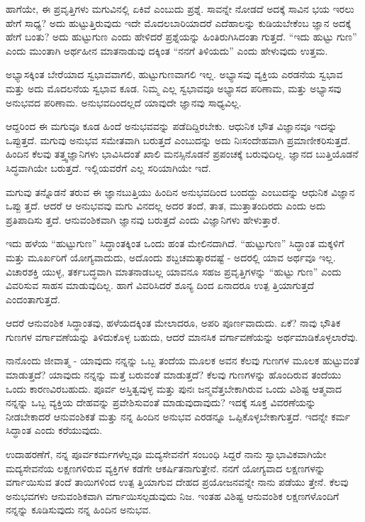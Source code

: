 ಹಾಗೆಯೇ, ಈ ಪ್ರವೃತ್ತಿಗಳು ಮಗುವಿನಲ್ಲಿ ಏಕಿವೆ ಎಂಬುದು ಪ್ರಶ್ನೆ. ಸಾವನ್ನೇ ನೋಡದೆ ಅದಕ್ಕೆ ಸಾವಿನ ಭಯ ಇರಲು ಹೇಗೆ ಸಾಧ್ಯ? ಅದು ಹುಟ್ಟುತ್ತಿರುವುದು ಇದೇ ಮೊದಲಬಾರಿಯಾದರೆ ಎದೆಹಾಲನ್ನು ಕುಡಿಯಬೇಕೆಂಬ ಜ್ಞಾನ ಅದಕ್ಕೆ ಹೇಗೆ ಬಂತು? ಅದು ಹುಟ್ಟುಗುಣ ಎಂದು ಹೇಳಿದರೆ ಪ್ರಶ್ನೆಯನ್ನು ಹಿಂತಿರುಗಿಸಿದಂತಾ ಗುತ್ತದೆ. “ಇದು ಹುಟ್ಟು ಗುಣ” ಎಂದು ಮುಂತಾಗಿ ಅರ್ಥಹೀನ ಮಾತನಾಡುವು ದಕ್ಕಿಂತ “ನನಗೆ ತಿಳಿಯದು” ಎಂದು ಹೇಳುವುದು ಉತ್ತಮ.

ಅಭ್ಯಾಸಕ್ಕಿಂತ  ಬೇರೆಯಾದ ಸ್ವಭಾವವಾಗಲಿ, ಹುಟ್ಟುಗುಣವಾಗಲಿ ಇಲ್ಲ. ಅಭ್ಯಾಸವು ವ್ಯಕ್ತಿಯ ಎರಡನೆಯ ಸ್ವಭಾವ ಮತ್ತು ಅದು ಮೊದಲನೆಯ ಸ್ವಭಾವ ಕೂಡ. ನಿಮ್ಮ ಎಲ್ಲ ಸ್ವಭಾವವೂ ಅಭ್ಯಾಸದ ಪರಿಣಾಮ, ಮತ್ತು ಅಭ್ಯಾಸವು ಅನುಭವದ ಪರಿಣಾಮ. ಅನುಭವದಿಂದಲ್ಲದೆ ಯಾವುದೇ ಜ್ಞಾನವು ಸಾಧ್ಯವಿಲ್ಲ.

ಆದ್ದರಿಂದ ಈ ಮಗುವೂ ಕೂಡ ಹಿಂದೆ ಅನುಭವವನ್ನು ಪಡೆದಿದ್ದಿರಬೇಕು. ಆಧುನಿಕ ಭೌತ ವಿಜ್ಞಾನವೂ ಇದನ್ನು ಒಪ್ಪುತ್ತದೆ. ಮಗುವು ಅನುಭವ ಸಮೇತವಾಗಿ ಬರುತ್ತದೆ ಎಂಬುದನ್ನು ಅದು ನಿಃಸಂದೇಹವಾಗಿ ಪ್ರಮಾಣೀಕರಿಸುತ್ತದೆ. ಹಿಂದಿನ ಕೆಲವು ತತ್ತ್ವಜ್ಞಾನಿಗಳು ಭಾವಿಸಿದಂತೆ ಖಾಲಿ ಮನಸ್ಸಿನೊಡನೆ ಪ್ರಪಂಚಕ್ಕೆ ಬರುವುದಿಲ್ಲ. ಜ್ಞಾನದ ಬುತ್ತಿಯೊಡನೆ ಸಿದ್ಧವಾಗಿಯೇ ಬರುತ್ತದೆ. ಇಲ್ಲಿಯವರೆಗೆ ಎಲ್ಲ ಸರಿಯಾಗಿಯೇ ಇದೆ.

ಮಗುವು ತನ್ನೊಡನೆ ತರುವ ಈ ಜ್ಞಾನಬುತ್ತಿಯು ಹಿಂದಿನ ಅನುಭವದಿಂದ ಬಂದದ್ದು ಎಂಬುದನ್ನು ಆಧುನಿಕ ವಿಜ್ಞಾನ ಒಪ್ಪು ತ್ತದೆ. ಆದರೆ ಆ ಅನುಭವವು ಮಗು ವಿನದಲ್ಲ ಅದರ ತಂದೆ, ತಾತ, ಮುತ್ತಾತಂದಿರದು ಎಂದು ಅದು ಪ್ರತಿಪಾದಿಸು ತ್ತದೆ. ಆನುವಂಶಿಕವಾಗಿ ಜ್ಞಾನವು ಬರುತ್ತದೆ ಎಂದು ವಿಜ್ಞಾನಿಗಳು ಹೇಳುತ್ತಾರೆ.

ಇದು ಹಳೆಯ “ಹುಟ್ಟುಗುಣ” ಸಿದ್ಧಾಂತಕ್ಕಿಂತ ಒಂದು ಹಂತ ಮೇಲಿನದಾಗಿದೆ. “ಹುಟ್ಟುಗುಣ” ಸಿದ್ಧಾಂತ ಮಕ್ಕಳಿಗೆ ಮತ್ತು ಮೂರ್ಖರಿಗೆ ಯೋಗ್ಯವಾದುದು, ಅದೊಂದು ಶಬ್ದಚಮತ್ಕಾರವಷ್ಟೆ - ಅದರಲ್ಲಿ ಯಾವ ಅರ್ಥವೂ ಇಲ್ಲ. ವಿಚಾರಶಕ್ತಿ ಯುಳ್ಳ, ತರ್ಕಬದ್ಧವಾಗಿ ಮಾತನಾಡಬಲ್ಲ ಯಾವನೂ ಸಹಜ ಪ್ರವೃತ್ತಿಗಳನ್ನು “ಹುಟ್ಟು ಗುಣ” ಎಂದು ವಿವರಿಸುವ ಸಾಹಸ ಮಾಡುವುದಿಲ್ಲ. ಹಾಗೆ ವಿವರಿಸಿದರೆ ಶೂನ್ಯ ದಿಂದ ಏನಾದರೂ ಉತ್ಪ ತ್ತಿಯಾಗುತ್ತದೆ ಎಂದಂತಾಗುತ್ತದೆ.

ಆದರೆ ಆನುವಂಶಿಕ ಸಿದ್ಧಾಂತವು, ಹಳೆಯದಕ್ಕಿಂತ ಮೇಲಾದರೂ, ಅಪರಿ ಪೂರ್ಣವಾದುದು. ಏಕೆ? ನಾವು ಭೌತಿಕ ಗುಣಗಳ ವರ್ಗಾವಣೆಯನ್ನು ತಿಳಿದುಕೊಳ್ಳ ಬಹುದು, ಆದರೆ ಮಾನಸಿಕ ವರ್ಗಾವಣೆಯನ್ನು ಅರ್ಥಮಾಡಿಕೊಳ್ಳಲಾರೆವು.

ನಾನೊಂದು ಜೀವಾತ್ಮ - ಯಾವುದು ನನ್ನನ್ನು ಒಬ್ಬ ತಂದೆಯ ಮೂಲಕ ಅವನ ಕೆಲವು ಗುಣಗಳ ಮೂಲಕ ಹುಟ್ಟುವಂತೆ ಮಾಡುತ್ತದೆ? ಯಾವುದು ನನ್ನನ್ನು ಮತ್ತೆ ಬರುವಂತೆ ಮಾಡುತ್ತದೆ? ಕೆಲವು ಗುಣಗಳನ್ನು ಹೊಂದಿರುವ ತಂದೆಯು ಒಂದು ಕಾರಣವಿರಬಹುದು. ಪೂರ್ವ ಅಸ್ತಿತ್ವವುಳ್ಳ ಮತ್ತು ಪುನಃ ಜನ್ಮವೆತ್ತಬೇಕಾಗಿರುವ ಒಂದು ವಿಶಿಷ್ಟ ಆತ್ಮವಾದ ನನ್ನನ್ನು ಒಬ್ಬ ವ್ಯಕ್ತಿಯ ದೇಹವನ್ನು ಪ್ರವೇಶಿಸುವಂತೆ ಮಾಡುವುದಾವುದು? ಇದಕ್ಕೆ ಸೂಕ್ತ ವಿವರಣೆಯನ್ನು ನೀಡಬೇಕಾದರೆ ಆನುವಂಶಿಕತೆ ಮತ್ತು ನನ್ನ ಹಿಂದಿನ ಅನುಭವ ಎರಡನ್ನೂ ಒಪ್ಪಿಕೊಳ್ಳಬೇಕಾಗುತ್ತದೆ. ಇದನ್ನೇ ಕರ್ಮ ಸಿದ್ಧಾಂತ ಎಂದು ಕರೆಯುವುದು.

ಉದಾಹರಣೆಗೆ, ನನ್ನ ಪೂರ್ವಕರ್ಮಗಳೆಲ್ಲವೂ ಮದ್ಯಸೇವನೆಗೆ ಸಂಬಂಧಿ ಸಿದ್ದರೆ ನಾನು ಸ್ವಾಭಾವಿಕವಾಗಿಯೇ ಮದ್ಯಸೇವನೆಯ ಲಕ್ಷಣಗಳಿರುವ ವ್ಯಕ್ತಿಗಳ ಕಡೆಗೇ ಆಕರ್ಷಿತನಾಗುತ್ತೇನೆ. ನನಗೆ ಯೋಗ್ಯವಾದ ಲಕ್ಷಣಗಳನ್ನು ವರ್ಗಾಯಿಸುವ ತಂದೆ ತಾಯಿಗಳಿಂದ ಉತ್ಪ ತ್ತಿಯಾಗುವ ದೇಹದ ಪ್ರಯೋಜನವನ್ನೇ ನಾನು ಪಡೆಯು ತ್ತೇನೆ. ಕೆಲವು ಅನುಭವಗಳು ಆನುವಂಶಿಕವಾಗಿ ವರ್ಗಾಯಿಸಲ್ಪಡುವುದು ನಿಜ. ಇಂತಹ ವಿಶಿಷ್ಟ ಆನುವಂಶಿಕ ಲಕ್ಷಣಗಳೊಂದಿಗೆ ನನ್ನನ್ನು ಕೂಡಿಸುವುದು ನನ್ನ ಹಿಂದಿನ ಅನುಭವ.

